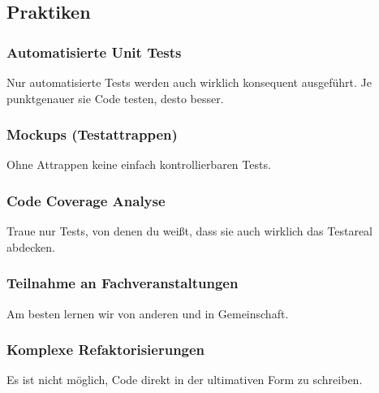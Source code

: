 \documentclass[a5paper, landscape]{article}
\begin{document}
	\begin{minipage}[t]{.5\textwidth}
		\subsection*{Praktiken}
		\subsubsection*{Automatisierte Unit Tests}
		Nur automatisierte Tests werden auch wirklich konsequent ausgeführt. Je punktgenauer sie Code testen, desto besser.
		\subsubsection*{Mockups (Testattrappen)}
		Ohne Attrappen keine einfach kontrollierbaren Tests.
		\subsubsection*{Code Coverage Analyse}
		Traue nur Tests, von denen du weißt, dass sie auch wirklich das Testareal abdecken.
		\subsubsection*{Teilnahme an Fachveranstaltungen}
		Am besten lernen wir von anderen und in Gemeinschaft.
		\subsubsection*{Komplexe Refaktorisierungen}
		Es ist nicht möglich, Code direkt in der ultimativen Form zu schreiben.
	\end{minipage}
		
\end{document}
